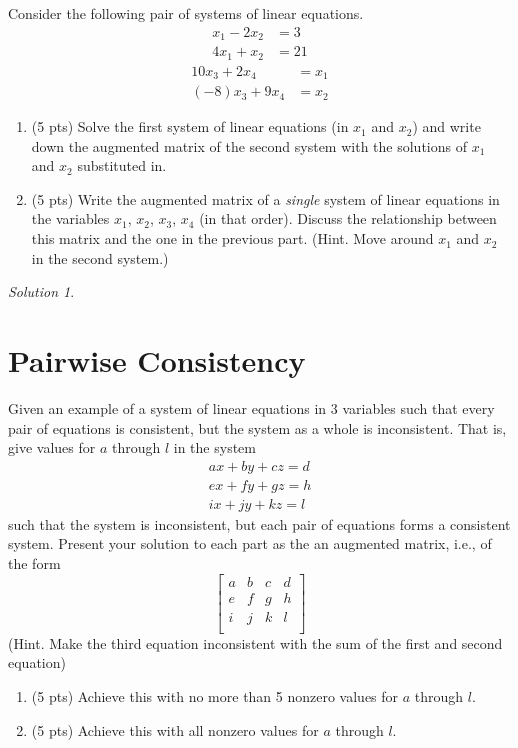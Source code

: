 \documentclass{article}
\theoremstyle{remark}
\newtheorem*{solution}{Solution}
\begin{document}
Consider the following pair of systems of linear equations.
\begin{align*}
  x_1 - 2x_2 &= 3 \\
  4x_1 + x_2 &= 21
\end{align*}
\begin{align*}
  10x_3 + 2x_4 &= x_1 \\
  (-8)x_3 + 9x_4 &= x_2
\end{align*}
\begin{enumerate}
\item (5 pts) Solve the first system of linear equations (in $x_1$ and $x_2$) and write down the augmented matrix of the second system with the solutions of $x_1$ and $x_2$ substituted in.
\item (5 pts) Write the augmented matrix of a \textit{single} system of linear equations in the variables $x_1$, $x_2$, $x_3$, $x_4$ (in that order). Discuss the relationship between this matrix and the one in the previous part. (Hint. Move around $x_1$ and $x_2$ in the second system.)
\end{enumerate}

\begin{solution}
\end{solution}

\pagebreak
\section{Pairwise Consistency}

Given an example of a system of linear equations in 3 variables such that every pair of equations is consistent, but the system as a whole is inconsistent. That is, give values for $a$ through $l$ in the system
\begin{align*}
  ax + by + cz = d \\
  ex + fy + gz = h \\
  ix + jy + kz = l
\end{align*}
such that the system is inconsistent, but each pair of equations forms a consistent system. Present your solution to each part as the an augmented matrix, i.e., of the form
\begin{displaymath}
  \begin{bmatrix}
    a & b & c & d \\
    e & f & g & h \\
    i & j & k & l \\
  \end{bmatrix}
\end{displaymath}
(Hint. Make the third equation inconsistent with the sum of the first and second equation)
\begin{enumerate}
\item (5 pts) Achieve this with no more than 5 nonzero values for $a$ through $l$.
\item (5 pts) Achieve this with all nonzero values for $a$ through $l$.
\end{enumerate}
\end{document}
